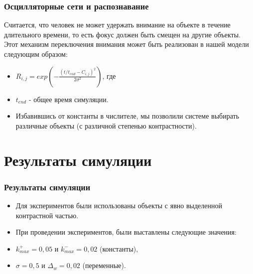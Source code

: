 \documentclass{beamer}
\begin{document}
\begin{frame}
\frametitle{Осцилляторные сети и распознавание}

Считается, что человек не может удержать внимание на объекте в течение длительного времени, то есть фокус должен быть смещен на другие объекты. Этот механизм переключения внимания может быть реализован в нашей модели следующим образом:
\medskip
\begin{itemize}
\item[]
\begin{center}
	$R_{i,j} = exp(- \frac{(t/t_{end}-C_{i,j})^2}{2\sigma^2})$, где
\end{center}
\item[] $t_{end}$ - общее время симуляции.

\item[] Избавившись от константы в числителе, мы позволили системе выбирать различные объекты (с различной степенью контрастности). 
\end{itemize}
\end{frame}


\section{Результаты симуляции}

\begin{frame}
\frametitle{Результаты симуляции}

\begin{itemize}
\item[] Для экспериментов были использованы объекты с явно выделенной контрастной частью.
\bigskip
\item[] При проведении экспериментов, были выставлены следующие значения:
\item[] $k^{+}_{max} = 0,05$ и $k^{-}_{max} = 0,02$ (константы),
\item[] $\sigma = 0,5$ и $\Delta_w = 0,02$ (переменные). 
\end{itemize}
\end{frame}

\end{document}
